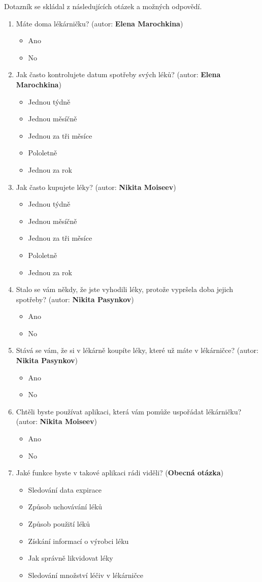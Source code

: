 \documentclass[a4paper, 11pt]{article}
\begin{document}
Dotazník se skládal z následujících otázek a možných odpovědí.
\begin{enumerate}
\item Máte doma lékárničku? (autor: \textbf{Elena Marochkina})
\begin{itemize}
\item Ano
\item No
\end{itemize}
\item Jak často kontrolujete datum spotřeby svých léků? (autor: \textbf{Elena Marochkina})
\begin{itemize}
    \item Jednou týdně
    \item Jednou měsíčně
    \item Jednou za tři měsíce
    \item Pololetně
    \item Jednou za rok
\end{itemize}
\item Jak často kupujete léky? (autor: \textbf{Nikita Moiseev})
\begin{itemize}
    \item Jednou týdně
    \item Jednou měsíčně
    \item Jednou za tři měsíce
    \item Pololetně
    \item Jednou za rok
\end{itemize}
\item Stalo se vám někdy, že jste vyhodili léky, protože vypršela doba jejich spotřeby? (autor: \textbf{Nikita Pasynkov})
\begin{itemize}
\item Ano
\item No
\end{itemize}
\item Stává se vám, že si v lékárně koupíte léky, které už máte v lékárničce? (autor: \textbf{Nikita Pasynkov})
\begin{itemize}
\item Ano
\item No
\end{itemize}
\item Chtěli byste používat aplikaci, která vám pomůže uspořádat lékárničku? (autor: \textbf{Nikita Moiseev})
\begin{itemize}
\item Ano
\item No
\end{itemize}
\item Jaké funkce byste v takové aplikaci rádi viděli? (\textbf{Obecná otázka})
\begin{itemize}
\item Sledování data expirace
\item Způsob uchovávání léků
\item Způsob použití léků
\item Získání informací o výrobci léku
\item Jak správně likvidovat léky
\item Sledování množství léčiv v lékárničce
\end{itemize}
\end{enumerate}
\end{document}

